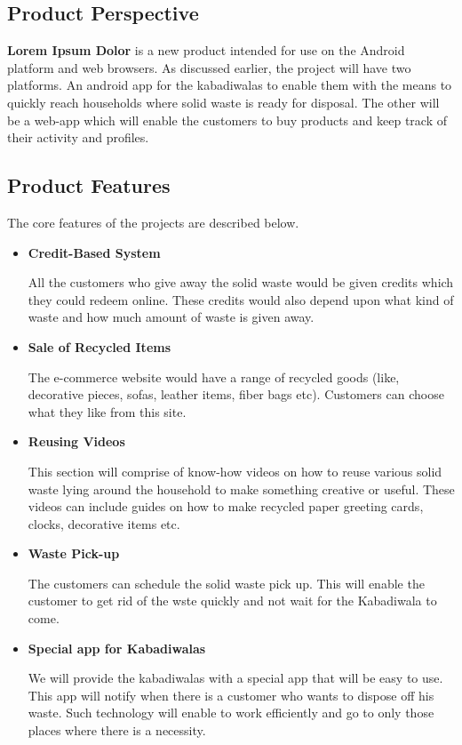 \documentclass{article}
\begin{document}
\subsection{Product Perspective}
\par \textbf{Lorem Ipsum Dolor} is a new product intended for use on the Android platform and web browsers. As discussed earlier, the project will have two platforms. An android app for the kabadiwalas to enable them with the means to quickly reach households where solid waste is ready for disposal. The other will be a web-app which will enable the customers to buy products and keep track of their activity and profiles.
\subsection{Product Features}
\par The core features of the projects are described below. 
\begin{itemize}
    \item \textbf{Credit-Based System}
    \par All the customers who give away the solid waste would be given credits which they could redeem online.
    These credits would also depend upon what kind of waste and how much amount of waste is given away.
    
    \item \textbf{Sale of Recycled Items}
    \par The e-commerce website would have a range of recycled goods (like, decorative pieces, sofas, leather items, fiber bags etc). Customers can choose what they like from this site.
    
    \item \textbf{Reusing Videos}
    \par This section will comprise of know-how videos on how to reuse various solid waste lying around the household to make something creative or useful. These videos can include guides on how to make recycled paper greeting cards, clocks, decorative items etc. 
    
    \item \textbf{Waste Pick-up}
    \par The customers can schedule the solid waste pick up. This will enable the customer to get rid of the wste quickly and not wait for the Kabadiwala to come. 
    
    \item \textbf{Special app for Kabadiwalas}
    \par We will provide the kabadiwalas with a special app that will be easy to use. This app will notify when there is a customer who wants to dispose off his waste. Such technology will enable to work efficiently and go to only those places where there is a necessity.
    
    
\end{itemize}
\end{document}
